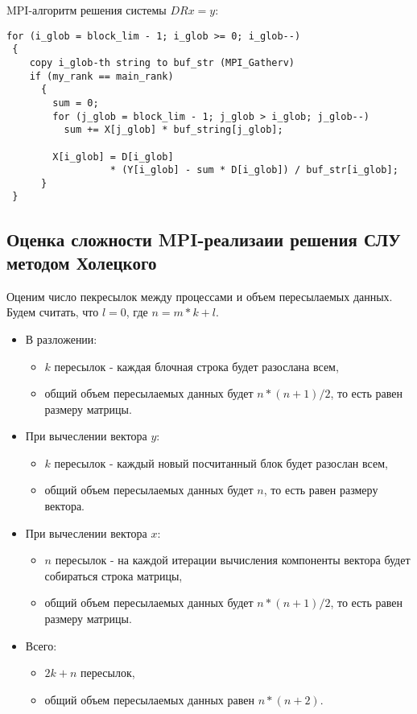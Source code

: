 \documentclass[a4paper,12pt]{article}
\begin{document}
    MPI-алгоритм решения системы $DRx = y$:

\begin{verbatim}
for (i_glob = block_lim - 1; i_glob >= 0; i_glob--)
 {
    copy i_glob-th string to buf_str (MPI_Gatherv)
    if (my_rank == main_rank)
      {
        sum = 0;
        for (j_glob = block_lim - 1; j_glob > i_glob; j_glob--)
          sum += X[j_glob] * buf_string[j_glob];
        
        X[i_glob] = D[i_glob] 
                  * (Y[i_glob] - sum * D[i_glob]) / buf_str[i_glob];
      }
 }
\end{verbatim}
    
    
\newpage
\subsection{Оценка сложности MPI-реализаии решения СЛУ методом Холецкого}

    Оценим число пекресылок между процессами и объем пересылаемых данных.
    Будем считать, что $l = 0$, где $n = m * k + l$.
    
    \begin{itemize}
        \item В разложении:
        \begin{itemize}
            \item $k$ пересылок - каждая блочная строка будет разослана всем,
            \item общий объем пересылаемых данных будет $n*(n+1)/2$, то есть равен размеру матрицы.
        \end{itemize}
        \item При вычеслении вектора $y$:
        \begin{itemize}
            \item $k$ пересылок - каждый новый посчитанный блок будет разослан всем,
            \item общий объем пересылаемых данных будет $n$, то есть равен размеру вектора.
        \end{itemize}
        \item При вычеслении вектора $x$:
        \begin{itemize}
            \item $n$ пересылок - на каждой итерации вычисления компоненты вектора 
                  будет собираться строка матрицы,
            \item общий объем пересылаемых данных будет $n*(n+1)/2$, то есть равен размеру матрицы.
        \end{itemize}
        \item Всего:
        \begin{itemize}
            \item $2k + n$ пересылок,
            \item общий объем пересылаемых данных равен $n*(n+2)$.
        \end{itemize}
    \end{itemize}
    
\end{document}
